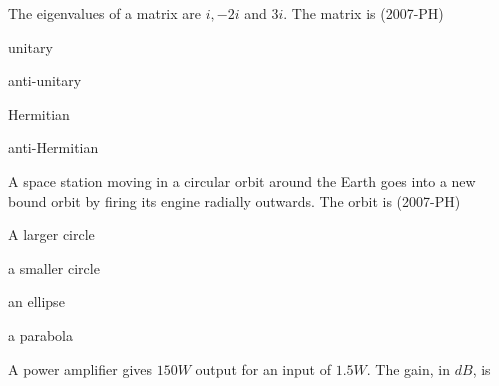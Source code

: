 
\iffalse

\title{2007-PH-1-17}
\author{EE24BTECH11010 - BALAJI B}
\section{ph}
\chapter{2007}
\fi

    \item The eigenvalues of a matrix are $i, -2i$ and $3i$. The matrix is \hfill (2007-PH)
    \begin{enumerate}
        \begin{multicols}{2}
            \item unitary
            \item anti-unitary
            \item Hermitian 
            \item anti-Hermitian
        \end{multicols}
    \end{enumerate}
    \item A space station moving in a circular orbit around the Earth goes into a new bound orbit by firing its engine radially outwards. The orbit is \hfill (2007-PH)
    \begin{enumerate}
        \begin{multicols}{2}
            \item A larger circle
            \item a smaller circle
            \item an ellipse
            \item a parabola
        \end{multicols}
    \end{enumerate}
    \item A power amplifier gives $150W$ output for an input of $1.5W$. The gain, in $dB$, is
    
